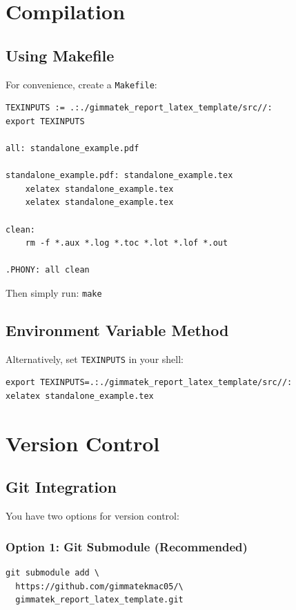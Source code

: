 \documentclass[12pt,a4paper]{gimmatek-report-template}
\begin{document}
\chapter{Compilation}

\section{Using Makefile}

For convenience, create a \texttt{Makefile}:

\begin{verbatim}
TEXINPUTS := .:./gimmatek_report_latex_template/src//:
export TEXINPUTS

all: standalone_example.pdf

standalone_example.pdf: standalone_example.tex
    xelatex standalone_example.tex
    xelatex standalone_example.tex

clean:
    rm -f *.aux *.log *.toc *.lot *.lof *.out

.PHONY: all clean
\end{verbatim}

Then simply run: \texttt{make}

\section{Environment Variable Method}

Alternatively, set \texttt{TEXINPUTS} in your shell:

\begin{verbatim}
export TEXINPUTS=.:./gimmatek_report_latex_template/src//:
xelatex standalone_example.tex
\end{verbatim}

\chapter{Version Control}

\section{Git Integration}

You have two options for version control:

\subsection{Option 1: Git Submodule (Recommended)}

\begin{verbatim}
git submodule add \
  https://github.com/gimmatekmac05/\
  gimmatek_report_latex_template.git
\end{verbatim}
\end{document}
